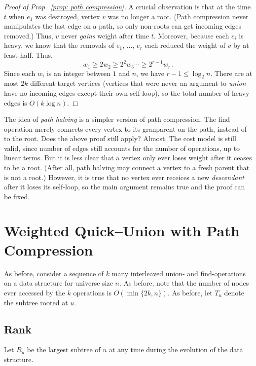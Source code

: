 \documentclass{tstextbook}
\begin{document}
\begin{proof}[Proof of Prop.~\ref{prop: path compression}]
  A crucial observation is that at the time $t$ when $e_1$ was destroyed, vertex $v$ was no longer a root.
  (Path compression never manipulates the last edge on a path, so only non-roots can get  incoming edges removed.)
  Thus, $v$ never \emph{gains} weight after time $t$.
  Moreover, because each $e_i$ is heavy, we know that the removals of $e_1$, $\ldots$, $e_r$ each reduced the weight of $v$ by at least half.
  Thus, 
  \[ w_1\geq 2 w_2 \geq 2^2w_3\cdots\geq 2^{r-1} w_r\,.\]
  Since each $w_i$ is an integer between $1$ and $n$, we have $r - 1\leq \log_2 n$.
  There are at most $2k$ different target vertices (vertices that were never an argument to \emph{union} have no incoming edges except their own self-loop), so the total number of heavy edges is $O(k\log n)$.
\end{proof}

\begin{ExerciseList}
  \Exercise{}
  The idea of \emph{path halving} is a simpler version of path compression. 
  The find operation merely connects every vertex to its granparent on the path, instead of to the root.
  Does the above proof still apply?
  \Answer{}
  Almost.
  The cost model is still valid, since number of edges still accounts for the number of operations, up to linear terms.
  But it is less clear that a vertex only ever loses weight after it ceases to be a root.
  (After all, path halving may connect a vertex to a fresh parent that is not a root.)
  However, it is true that no vertex ever receices a new \emph{descendant} after it loses its self-loop, so the main argument remains true and the proof can be fixed.
\end{ExerciseList}


\section{Weighted Quick--Union with Path Compression}

As before, consider a sequence of $k$ many interleaved union- and find-operations on a data structure for universe size $n$.
As before, note that the number of nodes ever accessed by the $k$ operations is $O(\min\{2k, n\})$.
As before, let $T_u$ denote the subtree rooted at $u$.


\subsection{Rank}

Let $R_u$ be the largest subtree of $u$ at any time during the evolution of the data structure.
\end{document}
